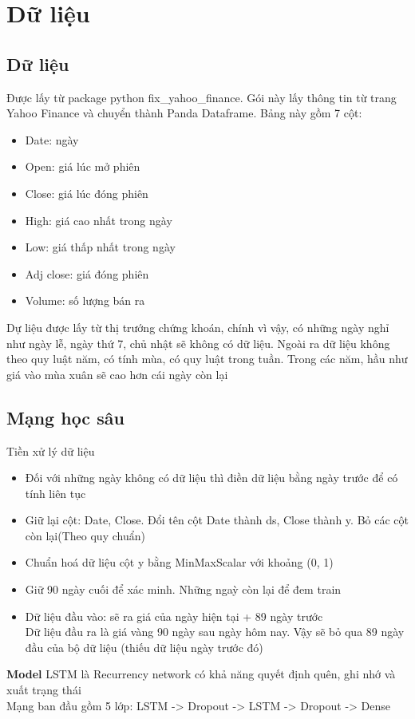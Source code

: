 %
\chapter{Dữ liệu}
\label{sec:data}

\section{Dữ liệu}
Được lấy từ package python fix\_yahoo\_finance. Gói này lấy thông tin từ trang Yahoo Finance và chuyển thành Panda Dataframe.
Bảng này gồm 7 cột:
\begin{itemize}
    \item Date: ngày
    \item Open: giá lúc mở phiên
    \item Close: giá lúc đóng phiên
    \item High: giá cao nhất trong ngày
    \item Low: giá thấp nhất trong ngày
    \item Adj close: giá đóng phiên
    \item Volume: số lượng bán ra
\end{itemize}

Dự liệu được lấy từ thị trướng chứng khoán, chính vì vậy, có những ngày nghỉ như ngày lễ, ngày thứ 7, chủ nhật sẽ không có dữ liệu.
Ngoài ra dữ liệu không theo quy luật năm, có tính mùa, có quy luật trong tuần. Trong các năm, hầu như giá vào mùa xuân sẽ cao hơn cái ngày còn lại

\section{Mạng học sâu}
Tiền xử lý dữ liệu
\begin{itemize}
    \item Đối với những ngày không có dữ liệu thì điền dữ liệu bằng ngày trước để có tính liên tục \\
    \item Giữ lại cột: Date, Close. Đổi tên cột Date thành ds, Close thành y. Bỏ các cột còn lại(Theo quy chuẩn) \\
    \item Chuẩn hoá dữ liệu cột y bằng MinMaxScalar với khoảng (0, 1) \\
    \item Giữ 90 ngày cuối để xác minh. Những ngaỳ còn lại để đem train \\
    \item Dữ liệu đầu vào: sẽ ra giá của ngày hiện tại + 89 ngày trước \\
    Dữ liệu đầu ra là giá vàng 90 ngày sau ngày hôm nay. Vậy sẽ bỏ qua 89 ngày đầu của bộ dữ liệu (thiếu dữ liệu ngày trước đó) \\
\end{itemize}
\textbf{Model}
    LSTM là Recurrency network có khả năng quyết định quên, ghi nhớ và xuất trạng thái \\
    Mạng ban đầu gồm 5 lớp: LSTM -> Dropout -> LSTM -> Dropout -> Dense \\


